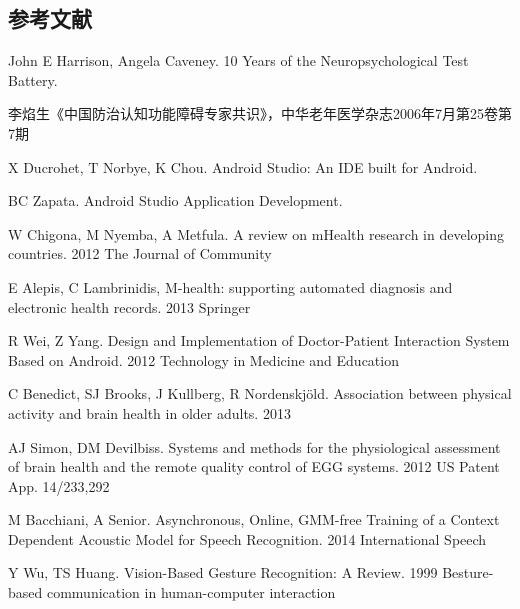 
\begin{center}
\chapter*{参考文献}
\end{center}

\begin{enumerate}[{$[$}1{$]$}]
\item John E Harrison, Angela Caveney. 10 Years of the Neuropsychological Test Battery.
\item 李焰生《中国防治认知功能障碍专家共识》，中华老年医学杂志2006年7月第25卷第7期
\item X Ducrohet, T Norbye, K Chou. Android Studio: An IDE built for Android.
\item BC Zapata. Android Studio Application Development.
\item W Chigona, M Nyemba, A Metfula. A review on mHealth research in developing countries. 2012 The Journal of Community
\item E Alepis, C Lambrinidis, M-health: supporting automated diagnosis and electronic health records. 2013 Springer
\item R Wei, Z Yang. Design and Implementation of Doctor-Patient Interaction System Based on Android. 2012 Technology in Medicine and Education
\item C Benedict, SJ Brooks, J Kullberg, R Nordenskjöld. Association between physical activity and brain health in older adults. 2013
\item AJ Simon, DM Devilbiss. Systems and methods for the physiological assessment of brain health and the remote quality control of EGG systems. 2012 US Patent App. 14/233,292
\item M Bacchiani, A Senior. Asynchronous, Online, GMM-free Training of a Context Dependent Acoustic Model for Speech Recognition. 2014 International Speech
\item Y Wu, TS Huang. Vision-Based Gesture Recognition: A Review. 1999 Besture-based communication in human-computer interaction
\end{enumerate}

